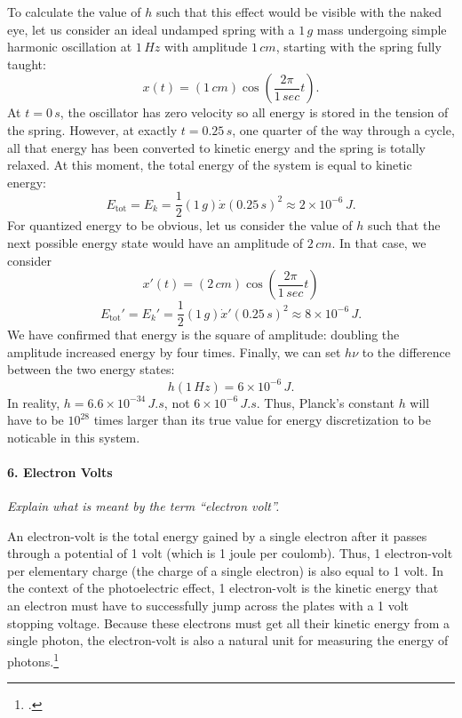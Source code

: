 \documentclass[12pt]{article}
\begin{document}
To calculate the value of $h$ such that this effect would be visible with the naked eye, let us consider an ideal undamped spring with a $1\,\si{g}$ mass undergoing simple harmonic oscillation at $1\,\si{Hz}$ with amplitude $1\,\si{cm}$, starting with the spring fully taught:
\begin{equation}
    x(t) = (1\,\si{cm}) \cos(\frac{2\pi}{1\,\si{sec}} t).
\end{equation}
At $t=0\,\si{s}$, the oscillator has zero velocity so all energy is stored in the tension of the spring. However, at exactly $t=0.25\,\si{s}$, one quarter of the way through a cycle, all that energy has been converted to kinetic energy and the spring is totally relaxed. At this moment, the total energy of the system is equal to kinetic energy:
\begin{equation}
    E_\text{tot} = E_k = \frac{1}{2} (1\,\si{g}) \dot{x}(0.25\,\si{s})^2 \approx 2\times10^{-6}\,\si{J}.
\end{equation}
For quantized energy to be obvious, let us consider the value of $h$ such that the next possible energy state would have an amplitude of $2\,\si{cm}$. In that case, we consider
\begin{equation}
    x'(t) = (2\,\si{cm})\cos(\frac{2\pi}{1\,\si{sec}} t)
\end{equation}
\begin{equation}
    E_\text{tot}' = E_k' = \frac{1}{2}(1\,\si{g})\dot{x}'(0.25\,\si{s})^2 \approx 8\times10^{-6}\,\si{J}.
\end{equation}
We have confirmed that energy is the square of amplitude: doubling the amplitude increased energy by four times. Finally, we can set $h \nu$ to the difference between the two energy states:
\begin{equation}
    h (1\,\si{Hz}) = 6\times10^{-6}\,\si{J}.
\end{equation}
In reality, $h = 6.6\times10^{-34}\,\si{J.s}$, not $6\times10^{-6}\,\si{J.s}$. Thus, Planck's constant $h$ will have to be $10^{28}$ times larger than its true value for energy discretization to be noticable in this system.

\paragraph{6. Electron Volts} \emph{Explain what is meant by the term “electron volt”.} \medskip

An electron-volt is the total energy gained by a single electron after it passes through a potential of 1 volt (which is 1 joule per coulomb). Thus, 1 electron-volt per elementary charge (the charge of a single electron) is also equal to 1 volt. In the context of the photoelectric effect, 1 electron-volt is the kinetic energy that an electron must have to successfully jump across the plates with a 1 volt stopping voltage. Because these electrons must get all their kinetic energy from a single photon, the electron-volt is also a natural unit for measuring the energy of photons.\footcite{ev}
\end{document}
